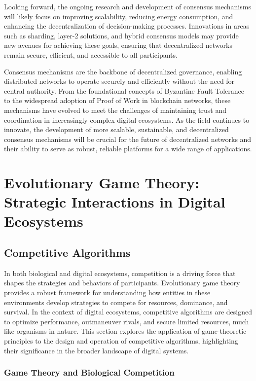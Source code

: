 \documentclass[12pt,twoside]{article}
\begin{document}
Looking forward, the ongoing research and development of consensus mechanisms will likely focus on improving scalability, reducing energy consumption, and enhancing the decentralization of decision-making processes. Innovations in areas such as sharding, layer-2 solutions, and hybrid consensus models may provide new avenues for achieving these goals, ensuring that decentralized networks remain secure, efficient, and accessible to all participants.

Consensus mechanisms are the backbone of decentralized governance, enabling distributed networks to operate securely and efficiently without the need for central authority. From the foundational concepts of Byzantine Fault Tolerance to the widespread adoption of Proof of Work in blockchain networks, these mechanisms have evolved to meet the challenges of maintaining trust and coordination in increasingly complex digital ecosystems. As the field continues to innovate, the development of more scalable, sustainable, and decentralized consensus mechanisms will be crucial for the future of decentralized networks and their ability to serve as robust, reliable platforms for a wide range of applications.

\section{Evolutionary Game Theory: Strategic Interactions in Digital Ecosystems}

\subsection{Competitive Algorithms}

In both biological and digital ecosystems, competition is a driving force that shapes the strategies and behaviors of participants. Evolutionary game theory provides a robust framework for understanding how entities in these environments develop strategies to compete for resources, dominance, and survival. In the context of digital ecosystems, competitive algorithms are designed to optimize performance, outmaneuver rivals, and secure limited resources, much like organisms in nature. This section explores the application of game-theoretic principles to the design and operation of competitive algorithms, highlighting their significance in the broader landscape of digital systems.

\subsubsection{Game Theory and Biological Competition}
\end{document}
